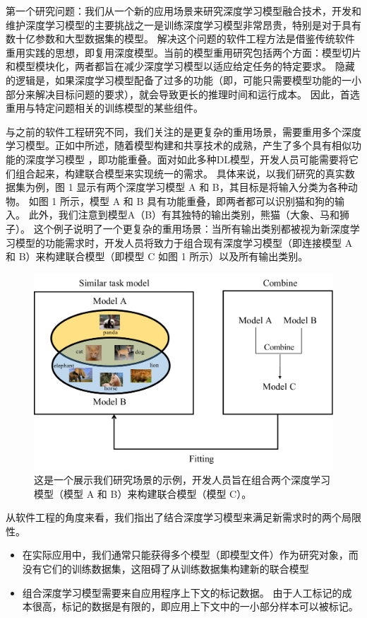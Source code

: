 \documentclass[fontset=macnew,UTF8]{article} %
\begin{document}
第一个研究问题：我们从一个新的应用场景来研究深度学习模型融合技术，开发和维护深度学习模型的主要挑战之一是训练深度学习模型非常昂贵，特别是对于具有数十亿参数和大型数据集的模型\cite{li2021modeldiff,shen2020mcp}。 解决这个问题的软件工程方法是借鉴传统软件重用实践的思想\cite{poulin1996measuring}，即复用深度模型\cite{pan2022decomposing,meng2021measuring}。当前的模型重用研究包括两个方面：模型切片\cite{zhang2022remos}和模型模块化\cite{pan2020decomposing,qi2022patching}，两者都旨在减少深度学习模型以适应给定任务的特定要求。 隐藏的逻辑是，如果深度学习模型配备了过多的功能（即，可能只需要模型功能的一小部分来解决目标问题的要求），就会导致更长的推理时间和运行成本。 因此，首选重用与特定问题相关的训练模型的某些组件\cite{qi2023reusing}。

与之前的软件工程研究不同，我们关注的是更复杂的重用场景，需要重用多个深度学习模型。正如\cite{meng2021measuring}中所述，随着模型构建和共享技术的成熟，产生了多个具有相似功能的深度学习模型 ，即功能重叠。面对如此多种DL模型，开发人员可能需要将它们组合起来，构建联合模型来实现统一的需求。 具体来说，以我们研究的真实数据集为例，图 1 显示有两个深度学习模型 A 和 B，其目标是将输入分类为各种动物。 如图 1 所示，模型 A 和 B 具有功能重叠，即两者都可以识别猫和狗的输入。 此外，我们注意到模型A（B）有其独特的输出类别，熊猫（大象、马和狮子）。 这个例子说明了一个更复杂的重用场景：当所有输出类别都被视为新深度学习模型的功能需求时，开发人员将致力于组合现有深度学习模型（即连接模型 A 和 B）来构建联合模型（即模型 C 如图 1 所示）以及所有输出类别。

\begin{figure}[h]
	\centering
	\includegraphics[width=0.5\linewidth]{MCCP_scene.pdf}
	\caption{这是一个展示我们研究场景的示例，开发人员旨在组合两个深度学习模型（模型 A 和 B）来构建联合模型（模型 C）。}
	\label{MCCP}
\end{figure}

从软件工程的角度来看，我们指出了结合深度学习模型来满足新需求时的两个局限性。
\begin{itemize}
	\item 在实际应用中，我们通常只能获得多个模型（即模型文件）作为研究对象，而没有它们的训练数据集，这阻碍了从训练数据集构建新的联合模型
	 \item  组合深度学习模型需要来自应用程序上下文的标记数据。 由于人工标记的成本很高，标记的数据是有限的，即应用上下文中的一小部分样本可以被标记。
\end{itemize}
\end{document}
